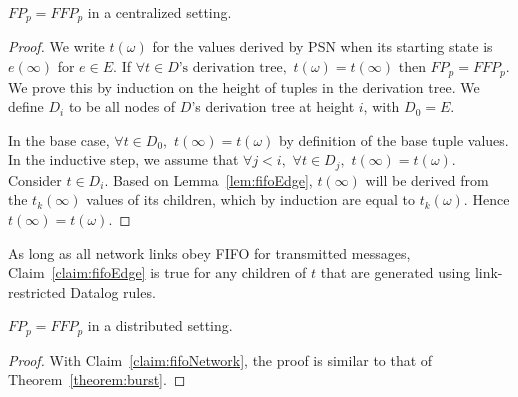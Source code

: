 \begin{Theorem} \label{theorem:burst}
$FP_{p} = FFP_{p}$ in a centralized setting.
\end{Theorem}
\begin{proof}
We write $t(\omega)$ for the values derived by PSN when its starting state
is $e(\infty)$ for $e \in E$. If $\forall t \in \mbox{$D$'s derivation
tree},$ $t(\omega) = t(\infty)$ then $FP_{p} = FFP_{p}$. We prove this by
induction on the height of tuples in the derivation tree. We define $D_i$
to be all nodes of $D$'s derivation tree at height $i$, with $D_0=E$.

In the base case, $\forall t \in D_0,$ $t(\infty) = t(\omega)$ by definition
of the base tuple values. In the inductive step, we assume that $\forall
j < i,$ $\forall t
\in D_j,$ $t(\infty) = t(\omega)$. Consider $t \in D_i$.  Based on
Lemma~\ref{lem:fifoEdge}, $t(\infty)$ will be derived from the
$t_k(\infty)$ values of its children, which by induction are equal to
$t_k(\omega)$.  Hence $t(\infty) = t(\omega)$.
\end{proof}

%

\begin{Claim}\label{claim:fifoNetwork}As long as all network links obey
  FIFO for transmitted messages, Claim~\ref{claim:fifoEdge} is true
  for any children of $t$ that are generated using link-restricted
    Datalog rules. 
\end{Claim}

\begin{Theorem}\label{theorem:netburst}$FP_{p} = FFP_{p}$ in a distributed setting.
\end{Theorem}
\begin{proof}With Claim~\ref{claim:fifoNetwork}, the proof is similar to
  that of Theorem~\ref{theorem:burst}.\end{proof}


